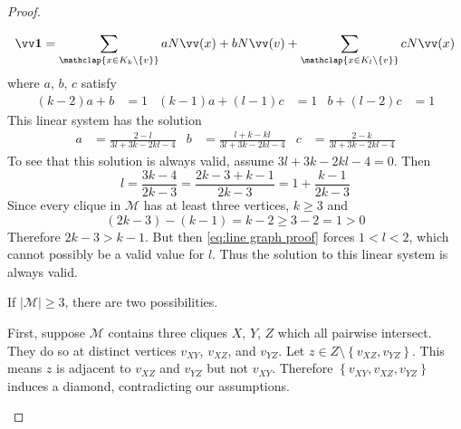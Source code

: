 \begin{proof}
\begin{case}
	\[ \onevect = \sum_{\mathclap{x \in K_k\setminus \left\{v\right\}}} a \nvect{x} + b \nvect{v} + \sum_{\mathclap{x \in K_l\setminus \left\{v\right\}}}c \nvect{x} \]
where $a$, $b$, $c$ satisfy
	\begin{align*}
		\left(k-2\right)a + b &= 1
		&\left(k-1\right)a + \left(l-1\right)c &= 1
		&b + \left(l-2\right)c &= 1
	\end{align*}
This linear system has the solution
	\begin{align*}
		a	&= \frac{2-l}{3l+3k-2kl-4}
		&b	&= \frac{l+k-kl}{3l+3k-2kl-4}
		&c	&= \frac{2-k}{3l+3k-2kl-4}
	\end{align*}
	To see that this solution is always valid, assume $3l+3k-2kl-4 = 0$. Then
	\begin{equation}\label{eq:line graph proof} l = \frac{3k-4}{2k-3} = \frac{2k-3+k-1}{2k-3} = 1+\frac{k-1}{2k-3}\end{equation}
	Since every clique in $\mathcal{M}$ has at least three vertices, $k\geq 3$ and
	\[ \left(2k-3\right)-\left(k-1\right) = k-2 \geq 3-2 = 1 > 0 \]
	Therefore $2k-3 > k-1$. But then \autoref{eq:line graph proof} forces $1 < l < 2$, which cannot possibly be a valid value for $l$. Thus the solution to this linear system is always valid.
\end{case}

\begin{case}If $\left|\mathcal{M}\right| \geq 3$, there are two possibilities.
	\begin{subcase}First, suppose $\mathcal{M}$ contains three cliques $X$, $Y$, $Z$ which all pairwise intersect. They do so at distinct vertices $v_{XY}$, $v_{XZ}$, and $v_{YZ}$. Let $z\in Z\setminus\!\left\{v_{XZ}, v_{YZ}\right\}$. This means $z$ is adjacent to $v_{XZ}$ and $v_{YZ}$ but not $v_{XY}$. Therefore $\left\{ v_{XY}, v_{XZ}, v_{YZ} \right\}$ induces a diamond, contradicting our assumptions.
	\end{subcase}
	\begin{center}\end{center}
	

\end{case}
\end{proof}
